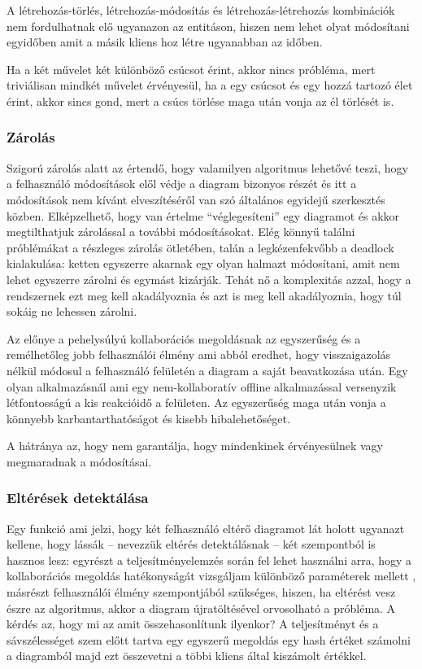 A létrehozás-törlés, létrehozás-módosítás és létrehozás-létrehozás kombinációk nem fordulhatnak elő ugyanazon az entitáson, hiszen nem lehet olyat módosítani egyidőben amit a másik kliens hoz létre ugyanabban az időben.

Ha a két művelet két különböző csúcsot érint, akkor nincs próbléma, mert triviálisan mindkét művelet érvényesül, ha a egy csúcsot és egy hozzá tartozó élet érint, akkor sincs gond, mert a csúcs törlése maga után vonja az él törlését is. 


\subsubsection{Zárolás}

Szigorú zárolás alatt az értendő, hogy valamilyen algoritmus lehetővé teszi, hogy a felhasználó módosítások elől védje a diagram bizonyos részét és itt a módosítások nem kívánt elveszítéséről van szó általános egyidejű szerkesztés közben. Elképzelhető, hogy van értelme ``véglegesíteni'' egy diagramot és akkor megtilthatjuk zárolással a további módosításokat. Elég könnyű találni próblémákat a részleges zárolás ötletében, talán a legkézenfekvőbb a deadlock kialakulása: ketten egyszerre akarnak egy olyan halmazt módosítani, amit nem lehet egyszerre zárolni és egymást kizárják. Tehát nő a komplexitás azzal, hogy a rendszernek ezt meg kell akadályoznia és azt is meg kell akadályoznia, hogy túl sokáig ne lehessen zárolni.  

Az előnye a pehelysúlyú kollaborációs megoldásnak az egyszerűség és a remélhetőleg jobb felhasználói élmény ami abból eredhet, hogy visszaigazolás nélkül módosul a felhasználó felületén a diagram a saját beavatkozása után. Egy olyan alkalmazásnál ami egy nem-kollaboratív offline alkalmazással versenyzik létfontosságú a kis reakcióidő a felületen. Az egyszerűség maga után vonja a könnyebb karbantarthatóságot és kisebb hibalehetőséget.   

A hátránya az, hogy nem garantálja, hogy mindenkinek érvényesülnek vagy megmaradnak a módosításai.

\subsubsection{Eltérések detektálása}

Egy funkció ami jelzi, hogy két felhasználó eltérő diagramot lát holott ugyanazt kellene, hogy lássák -- nevezzük eltérés detektálásnak -- két szempontból is hasznos lesz: egyrészt a teljesítményelemzés során fel lehet használni arra, hogy a kollaborációs megoldás hatékonyságát vizsgáljam különböző paraméterek mellett , másrészt felhasználói élmény szempontjából szükséges, hiszen, ha eltérést vesz észre az algoritmus, akkor a diagram újratöltésével orvosolható a próbléma. 
A kérdés az, hogy mi az amit összehasonlítunk ilyenkor? A teljesítményt és a sávszélességet szem előtt tartva egy egyszerű megoldás egy hash értéket számolni a diagramból majd ezt összevetni a többi kliens által kiszámolt értékkel.

